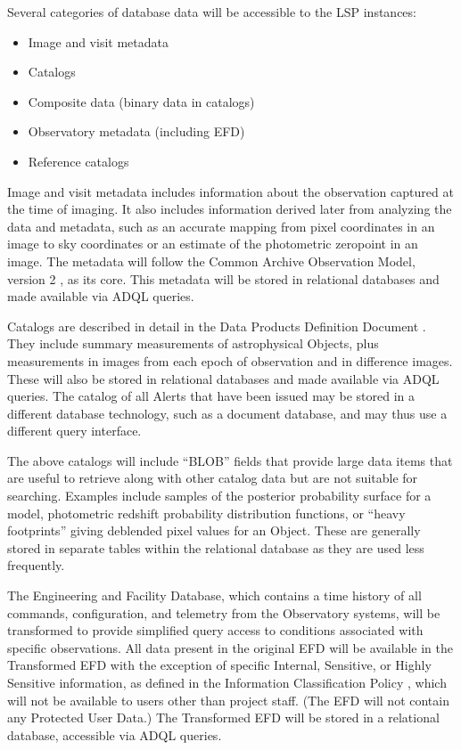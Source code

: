 Several categories of database data will be accessible to the LSP instances:
\begin{itemize}
\item Image and visit metadata
\item Catalogs
\item Composite data (binary data in catalogs)
\item Observatory metadata (including EFD)
\item Reference catalogs
\end{itemize}

Image and visit metadata includes information about the observation captured at
the time of imaging.
It also includes information derived later from analyzing the data
and metadata, such as an accurate mapping from pixel coordinates in an image to
sky coordinates or an estimate of the photometric zeropoint in an image.
The metadata will follow the Common Archive Observation
Model, version 2 \citep{2012ASPC..461..339D,CAOM2}, as its core.
This metadata will be stored in relational databases and made available
via ADQL queries.

Catalogs are described in detail in the Data Products Definition Document
.  They include summary measurements of astrophysical Objects,
plus measurements in images from each epoch of observation and in difference
images.  These will also be stored in relational databases and made available
via ADQL queries.  The catalog of all Alerts that have been issued may be
stored in a different database technology, such as a document database, and
may thus use a different query interface.

The above catalogs will include ``BLOB'' fields that provide large data items
that are useful to retrieve along with other catalog data but are not
suitable for searching.  Examples include samples of the posterior probability
surface for a model, photometric redshift probability distribution functions,
or ``heavy footprints'' giving deblended pixel values for an Object.  These
are generally stored in separate tables within the relational database as
they are used less frequently.

The Engineering and Facility Database, which contains a time history of all
commands, configuration, and telemetry from the Observatory systems, will
be transformed to provide simplified query access to conditions associated
with specific observations.
All data present in the original EFD will be available in the Transformed EFD
with the exception of specific Internal, Sensitive, or Highly Sensitive
information, as defined in the Information Classification Policy
,
which will not be available to users other than project staff.
(The EFD will not contain any Protected User Data.)
The Transformed EFD will be stored in a relational database,
accessible via ADQL queries.

